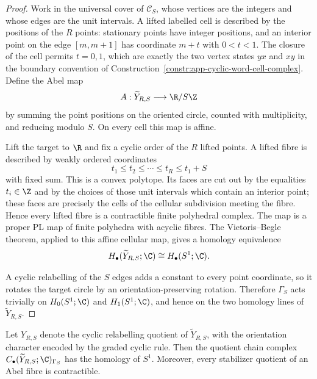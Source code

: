 \begin{proof}
  Work in the universal cover of \(\mathscr C_S\), whose vertices are the integers and
  whose edges are the unit intervals.  A lifted labelled cell is described by
  the positions of the \(R\) points: stationary points have integer positions,
  and an interior point on the edge \([m,m+1]\) has coordinate \(m+t\) with
  \(0<t<1\).  The closure of the cell permits \(t=0,1\), which are exactly the
  two vertex states \(yx\) and \(xy\) in the boundary convention of
  Construction~\ref{constr:app-cyclic-word-cell-complex}.  Define the Abel map
  \[
    A:\widetilde Y_{R,S}\longrightarrow \R/S\Z
  \]
  by summing the point positions on the oriented circle, counted with
  multiplicity, and reducing modulo \(S\).  On every cell this map is affine.

  Lift the target to \(\R\) and fix a cyclic order of the \(R\) lifted points.
  A lifted fibre is described by weakly ordered coordinates
  \[
    t_1\leq t_2\leq\cdots\leq t_R\leq t_1+S
  \]
  with fixed sum.  This is a convex polytope.  Its faces are cut out by the
  equalities \(t_i\in\Z\) and by the choices of those unit intervals which
  contain an interior point; these faces are precisely the cells of the
  cellular subdivision meeting the fibre.  Hence every lifted fibre is a
  contractible finite polyhedral complex.  The map is a proper PL map of
  finite polyhedra with acyclic fibres.  The Vietoris--Begle theorem, applied
  to this affine cellular map, gives a homology equivalence
  \[
    H_\bullet(\widetilde Y_{R,S};\C)\cong H_\bullet(S^1;\C).
  \]

  A cyclic relabelling of the \(S\) edges adds a constant to every point
  coordinate, so it rotates the target circle by an orientation-preserving
  rotation.  Therefore \(\Gamma_S\) acts trivially on
  \(H_0(S^1;\C)\) and \(H_1(S^1;\C)\), and hence on the two homology lines of
  \(\widetilde Y_{R,S}\).
\end{proof}

\begin{lem}
\label{lem:app-cyclic-abel-stabilizers}
  Let \(Y_{R,S}\) denote the cyclic relabelling quotient of
  \(\widetilde Y_{R,S}\), with the orientation character encoded by the
  graded cyclic rule.  Then the quotient chain complex
  \(C_\bullet(\widetilde Y_{R,S};\C)_{\Gamma_S}\) has the homology of \(S^1\).
  Moreover, every stabilizer quotient of an Abel fibre is contractible.
\end{lem}

